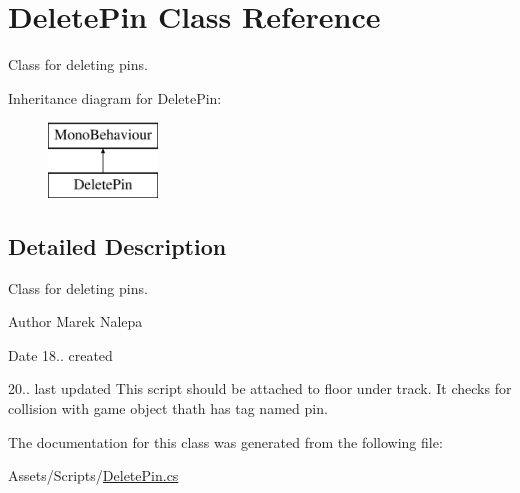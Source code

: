 \hypertarget{class_delete_pin}{}\section{Delete\+Pin Class Reference}
\label{class_delete_pin}


Class for deleting pins.  


Inheritance diagram for Delete\+Pin\+:\begin{figure}[H]
\begin{center}
\leavevmode
\includegraphics[height=2.000000cm]{class_delete_pin}
\end{center}
\end{figure}


\subsection{Detailed Description}
Class for deleting pins. 

\begin{DoxyAuthor}{Author}
Marek Nalepa 
\end{DoxyAuthor}
\begin{DoxyDate}{Date}
18.. created 

20.. last updated This script should be attached to floor under track. It checks for collision with game object thath has tag named \textquotesingle{}pin\textquotesingle{}. 
\end{DoxyDate}


The documentation for this class was generated from the following file\+:\begin{DoxyCompactItemize}
\item 
Assets/\+Scripts/\hyperlink{_delete_pin_8cs}{Delete\+Pin.\+cs}\end{DoxyCompactItemize}
